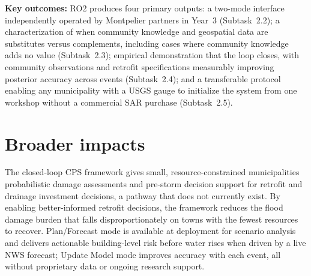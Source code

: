 \documentclass[11pt]{article}
\begin{document}
\textbf{Key outcomes:} RO2 produces four primary outputs: a two-mode interface independently operated by Montpelier partners in Year~3 (Subtask~2.2); a characterization of when community knowledge and geospatial data are substitutes versus complements, including cases where community knowledge adds no value (Subtask~2.3); empirical demonstration that the loop closes, with community observations and retrofit specifications measurably improving posterior accuracy across events (Subtask~2.4); and a transferable protocol enabling any municipality with a USGS gauge to initialize the system from one workshop without a commercial SAR purchase (Subtask~2.5).


\section{Broader impacts}

The closed-loop CPS framework gives small, resource-constrained municipalities
probabilistic damage assessments and pre-storm decision support for retrofit and
drainage investment decisions, a pathway that does not currently exist.
By enabling better-informed retrofit decisions, the framework reduces the flood
damage burden that falls disproportionately on towns with the fewest resources
to recover.
Plan/Forecast mode is available at deployment for scenario analysis and delivers actionable building-level risk before water rises when driven by a live NWS forecast; Update Model mode improves accuracy with each event, all without proprietary data or ongoing research support.
\end{document}

